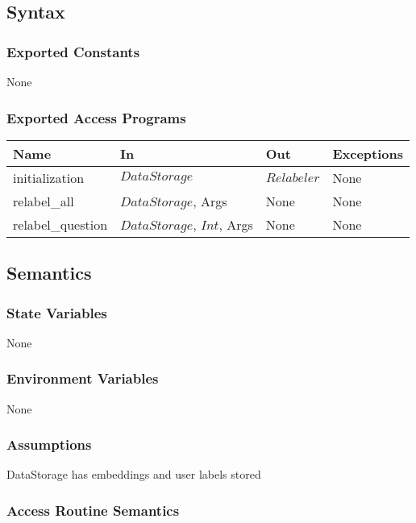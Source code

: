 \documentclass[12pt, titlepage]{article}
\begin{document}
\subsection{Syntax}

\subsubsection{Exported Constants}

None

\subsubsection{Exported Access Programs}

\begin{center}
\begin{tabular}{p{3cm} p{5cm} p{3cm} p{3cm}}
\hline
\textbf{Name} & \textbf{In} & \textbf{Out} & \textbf{Exceptions} \\
\hline
initialization & $DataStorage$ & $Relabeler$ & None \\
relabel\_all & $DataStorage$, Args & None & None \\
relabel\_question & $DataStorage$, $Int$, Args & None & None \\
\hline
\end{tabular}
\end{center}

\subsection{Semantics}

\subsubsection{State Variables}

None

\subsubsection{Environment Variables}

None

\subsubsection{Assumptions}

DataStorage has embeddings and user labels stored

\subsubsection{Access Routine Semantics}
\end{document}
